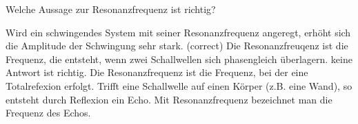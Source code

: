 \documentclass[11pt]{exam}
\begin{document}
\begin{questions}
\vspace{3mm}\question Welche Aussage zur Resonanzfrequenz ist richtig?

\begin{choices}
	\choice Wird ein schwingendes System mit seiner Resonanzfrequenz angeregt, erhöht sich die Amplitude der Schwingung sehr stark. (correct)
	\choice Die Resonanzfreuqenz ist die Frequenz, die entsteht, wenn zwei Schallwellen sich phasengleich überlagern.
	\choice keine Antwort ist richtig.
	\choice Die Resonanzfrequenz ist die Frequenz, bei der eine Totalrefexion erfolgt.
	\choice Trifft eine Schallwelle auf einen Körper (z.B. eine Wand), so entsteht durch Reflexion ein Echo. Mit Resonanzfrequenz bezeichnet man die Frequenz des Echos.
\end{choices}

\vspace{3mm}\end{questions}
\end{document}
